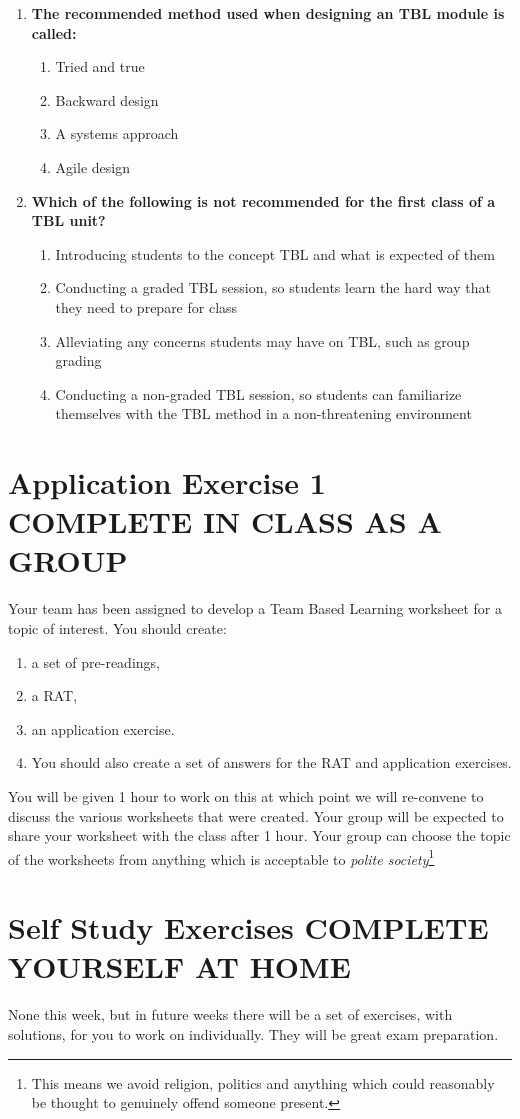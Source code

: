 \documentclass[twoside=false,DIV=14]{scrartcl}
\begin{document}
\begin{enumerate}
\item \textbf{The recommended method used when designing an TBL module is called:}
\begin{enumerate}
    \item Tried and true
    \item Backward design
    \item A systems approach
    \item Agile design
\end{enumerate}

\item \textbf{Which of the following is not recommended for the first class of a TBL unit?}
\begin{enumerate}
    \item Introducing students to the concept TBL and what is expected of them
    \item Conducting a graded TBL session, so students learn the hard way that they need to prepare for class
    \item Alleviating any concerns students may have on TBL, such as group grading
    \item Conducting a non-graded TBL session, so students can familiarize themselves with the TBL method in a non-threatening environment
\end{enumerate}
\end{enumerate}

\newpage
\part*{Application Exercise 1 \hspace{1em} {\small COMPLETE IN CLASS AS A GROUP}}
Your team has been assigned to develop a Team Based Learning worksheet for a topic of interest.  You should create:
\begin{enumerate}
\item a set of pre-readings, 
\item a RAT, 
\item an application exercise.  
\item You should also create a set of answers for the RAT and application exercises.
\end{enumerate}

You will be given 1 hour to work on this at which point we will re-convene to discuss the various worksheets that were created.  Your group will be expected to share your worksheet with the class after 1 hour.  Your group can choose the topic of the worksheets from anything which is acceptable to \emph{polite society}\footnote{This means we avoid religion, politics and anything which could reasonably be thought to genuinely offend someone present.}
\newpage
\part*{Self Study Exercises \hspace{2em} {\small COMPLETE YOURSELF AT HOME}}
None this week, but in future weeks there will be a set of exercises, with solutions, for you to work on individually.  They will be great exam preparation.
\end{document}
